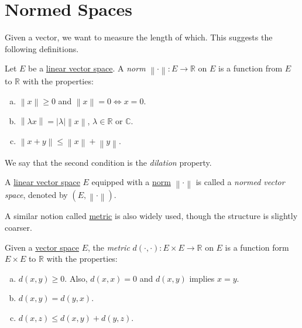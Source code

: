 \section{Normed Spaces}
Given a vector, we want to measure the length of which. This suggests the following definitions.

\begin{definition}[Norm]\label{def:norm}
	Let \(E\) be a \hyperref[def:linear-vector-space]{linear vector space}. A \emph{norm} \(\left\lVert \cdot \right\rVert \colon E \to \mathbb{R} \) on \(E\) is a function from \(E\) to \(\mathbb{R} \) with the properties:
	\begin{enumerate}[(a)]
		\item \(\left\lVert x\right\rVert \geq 0\) and \(\left\lVert x\right\rVert =0 \iff x=0\).
		\item \(\left\lVert \lambda x\right\rVert = \left\vert \lambda  \right\vert \left\lVert x\right\rVert\), \(\lambda \in\mathbb{R} \) or \(\mathbb{C} \).
		\item \(\left\lVert x+y\right\rVert \leq \left\lVert x\right\rVert + \left\lVert y\right\rVert \).
	\end{enumerate}
\end{definition}

\begin{notation}[Dilation]
	We say that the second condition is the \emph{dilation} property.
\end{notation}

\begin{definition}\label{def:normed-vector-space}
	A \hyperref[def:linear-vector-space]{linear vector space} \(E\) equipped with a \hyperref[def:norm]{norm} \(\left\lVert \cdot\right\rVert \) is called a \emph{normed vector space}, denoted by \((E, \left\lVert \cdot\right\rVert )\).
\end{definition}

A similar notion called \hyperref[prev:metric]{metric} is also widely used, though the structure is slightly coarser.

\begin{prev}[Metric]\label{prev:metric}
	Given a \hyperref[def:linear-vector-space]{vector space} \(E\), the \emph{metric} \(d(\cdot, \cdot)\colon E\times E\to \mathbb{R} \) on \(E\) is a function form \(E\times E\) to \(\mathbb{R} \) with the properties:
	\begin{enumerate}[(a)]
		\item \(d(x, y) \geq 0\). Also, \(d(x, x) = 0\) and \(d(x, y)\) implies \(x =y\).
		\item \(d(x, y) = d(y, x)\).
		\item \(d(x, z) \leq d(x, y) + d(y, z)\).
	\end{enumerate}
\end{prev}

